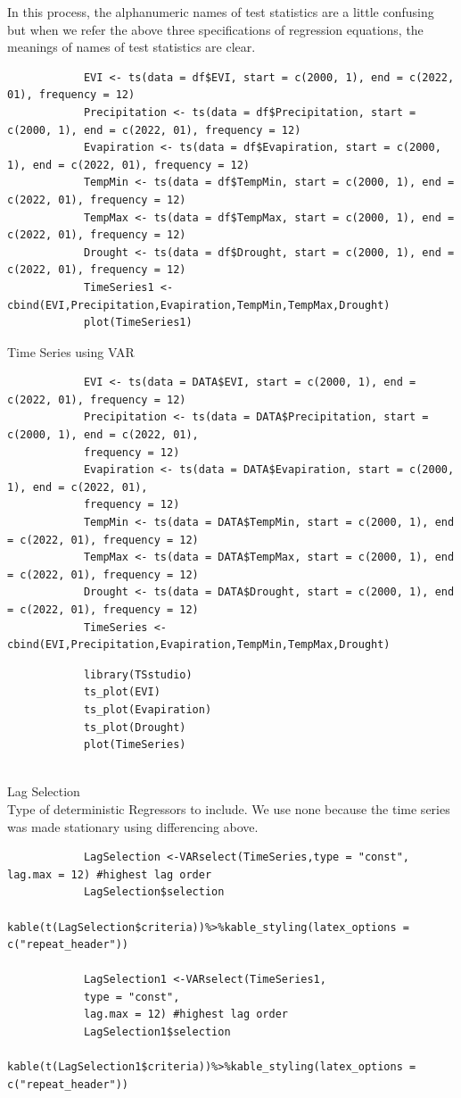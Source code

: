 \documentclass[12pt,a4paper]{book}
\begin{document}
			In this process, the alphanumeric names of test statistics are a little confusing but 
			when we refer the above three specifications of regression equations, the meanings of 
			names of test statistics are clear.
				\begin{shaded}
				\begin{verbatim}
			EVI <- ts(data = df$EVI, start = c(2000, 1), end = c(2022, 01), frequency = 12)
			Precipitation <- ts(data = df$Precipitation, start = c(2000, 1), end = c(2022, 01), frequency = 12)
			Evapiration <- ts(data = df$Evapiration, start = c(2000, 1), end = c(2022, 01), frequency = 12)
			TempMin <- ts(data = df$TempMin, start = c(2000, 1), end = c(2022, 01), frequency = 12)
			TempMax <- ts(data = df$TempMax, start = c(2000, 1), end = c(2022, 01), frequency = 12)
			Drought <- ts(data = df$Drought, start = c(2000, 1), end = c(2022, 01), frequency = 12)
			TimeSeries1 <- cbind(EVI,Precipitation,Evapiration,TempMin,TempMax,Drought)
			plot(TimeSeries1)
				\end{verbatim}
		\end{shaded}
	Time Series using  VAR
				\begin{shaded}
				\begin{verbatim}
			EVI <- ts(data = DATA$EVI, start = c(2000, 1), end = c(2022, 01), frequency = 12)
			Precipitation <- ts(data = DATA$Precipitation, start = c(2000, 1), end = c(2022, 01),
			frequency = 12)
			Evapiration <- ts(data = DATA$Evapiration, start = c(2000, 1), end = c(2022, 01), 
			frequency = 12)
			TempMin <- ts(data = DATA$TempMin, start = c(2000, 1), end = c(2022, 01), frequency = 12)
			TempMax <- ts(data = DATA$TempMax, start = c(2000, 1), end = c(2022, 01), frequency = 12)
			Drought <- ts(data = DATA$Drought, start = c(2000, 1), end = c(2022, 01), frequency = 12)
			TimeSeries <- cbind(EVI,Precipitation,Evapiration,TempMin,TempMax,Drought)
				\end{verbatim}
		\end{shaded}
	
				\begin{shaded}
				\begin{verbatim}
			library(TSstudio)
			ts_plot(EVI)
			ts_plot(Evapiration)
			ts_plot(Drought)
			plot(TimeSeries)
			
				\end{verbatim}
		\end{shaded}
	 Lag Selection \\
	Type of deterministic Regressors to include. We use none because the time series was made stationary using differencing above.
				\begin{shaded}
				\begin{verbatim}
			LagSelection <-VARselect(TimeSeries,type = "const", lag.max = 12) #highest lag order
			LagSelection$selection
			kable(t(LagSelection$criteria))%>%kable_styling(latex_options = c("repeat_header"))                
			
			LagSelection1 <-VARselect(TimeSeries1, 
			type = "const",  
			lag.max = 12) #highest lag order
			LagSelection1$selection
			kable(t(LagSelection1$criteria))%>%kable_styling(latex_options = c("repeat_header")) 
				\end{verbatim}
		\end{shaded}
	
\end{document}
